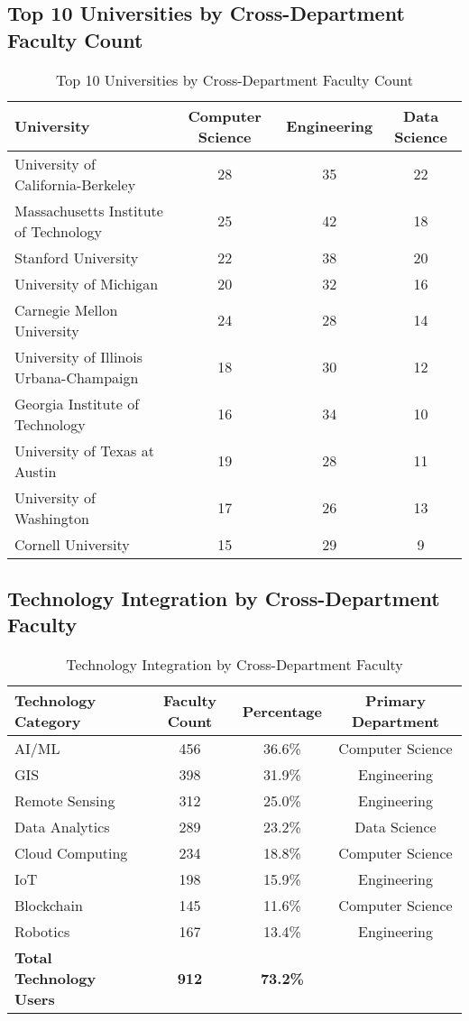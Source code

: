 \documentclass[12pt]{article}
\begin{document}
\subsection{Top 10 Universities by Cross-Department Faculty Count}

\begin{table}[h]
\centering
\caption{Top 10 Universities by Cross-Department Faculty Count}
\label{tab:university_distribution}
\begin{tabular}{lccc}
\toprule
\textbf{University} & \textbf{Computer Science} & \textbf{Engineering} & \textbf{Data Science} \\
\midrule
University of California-Berkeley & 28 & 35 & 22 \\
Massachusetts Institute of Technology & 25 & 42 & 18 \\
Stanford University & 22 & 38 & 20 \\
University of Michigan & 20 & 32 & 16 \\
Carnegie Mellon University & 24 & 28 & 14 \\
University of Illinois Urbana-Champaign & 18 & 30 & 12 \\
Georgia Institute of Technology & 16 & 34 & 10 \\
University of Texas at Austin & 19 & 28 & 11 \\
University of Washington & 17 & 26 & 13 \\
Cornell University & 15 & 29 & 9 \\
\bottomrule
\end{tabular}
\end{table}

\subsection{Technology Integration by Cross-Department Faculty}

\begin{table}[h]
\centering
\caption{Technology Integration by Cross-Department Faculty}
\label{tab:technology_integration}
\begin{tabular}{lccc}
\toprule
\textbf{Technology Category} & \textbf{Faculty Count} & \textbf{Percentage} & \textbf{Primary Department} \\
\midrule
AI/ML & 456 & 36.6\% & Computer Science \\
GIS & 398 & 31.9\% & Engineering \\
Remote Sensing & 312 & 25.0\% & Engineering \\
Data Analytics & 289 & 23.2\% & Data Science \\
Cloud Computing & 234 & 18.8\% & Computer Science \\
IoT & 198 & 15.9\% & Engineering \\
Blockchain & 145 & 11.6\% & Computer Science \\
Robotics & 167 & 13.4\% & Engineering \\
\midrule
\textbf{Total Technology Users} & \textbf{912} & \textbf{73.2\%} & \\
\bottomrule
\end{tabular}
\end{table}
\end{document}
